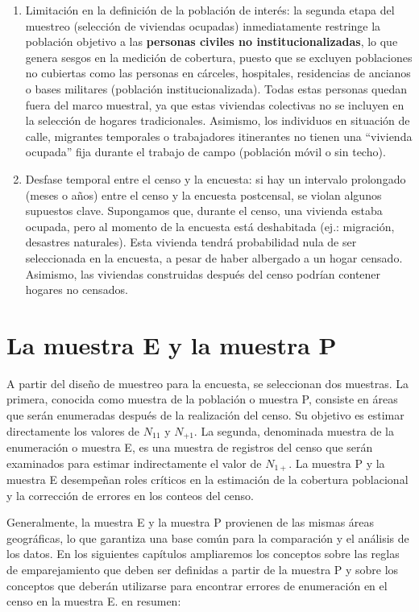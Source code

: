 \documentclass[
  12pt,
]{book}
\begin{document}
\begin{enumerate}
\def\labelenumi{\arabic{enumi}.}
\item
  Limitación en la definición de la población de interés: la segunda etapa del muestreo (selección de viviendas ocupadas) inmediatamente restringe la población objetivo a las \textbf{personas civiles no institucionalizadas}, lo que genera sesgos en la medición de cobertura, puesto que se excluyen poblaciones no cubiertas como las personas en cárceles, hospitales, residencias de ancianos o bases militares (población institucionalizada). Todas estas personas quedan fuera del marco muestral, ya que estas viviendas colectivas no se incluyen en la selección de hogares tradicionales. Asimismo, los individuos en situación de calle, migrantes temporales o trabajadores itinerantes no tienen una ``vivienda ocupada'' fija durante el trabajo de campo (población móvil o sin techo).
\item
  Desfase temporal entre el censo y la encuesta: si hay un intervalo prolongado (meses o años) entre el censo y la encuesta postcensal, se violan algunos supuestos clave. Supongamos que, durante el censo, una vivienda estaba ocupada, pero al momento de la encuesta está deshabitada (ej.: migración, desastres naturales). Esta vivienda tendrá probabilidad nula de ser seleccionada en la encuesta, a pesar de haber albergado a un hogar censado. Asimismo, las viviendas construidas después del censo podrían contener hogares no censados.
\end{enumerate}

\hypertarget{la-muestra-e-y-la-muestra-p}{%
\section{La muestra E y la muestra P}\label{la-muestra-e-y-la-muestra-p}}

A partir del diseño de muestreo para la encuesta, se seleccionan dos muestras. La primera, conocida como muestra de la población o muestra P, consiste en áreas que serán enumeradas después de la realización del censo. Su objetivo es estimar directamente los valores de \(N_{11}\) y \(N_{+1}\). La segunda, denominada muestra de la enumeración o muestra E, es una muestra de registros del censo que serán examinados para estimar indirectamente el valor de \(N_{1+}\). La muestra P y la muestra E desempeñan roles críticos en la estimación de la cobertura poblacional y la corrección de errores en los conteos del censo.

Generalmente, la muestra E y la muestra P provienen de las mismas áreas geográficas, lo que garantiza una base común para la comparación y el análisis de los datos. En los siguientes capítulos ampliaremos los conceptos sobre las reglas de emparejamiento que deben ser definidas a partir de la muestra P y sobre los conceptos que deberán utilizarse para encontrar errores de enumeración en el censo en la muestra E. en resumen:
\end{document}
